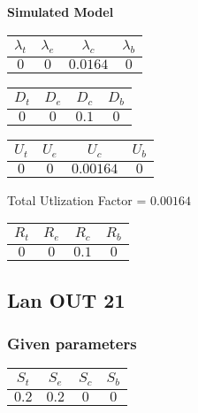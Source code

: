 \documentclass{article}
\begin{document}
\begin{minipage}{0.5\textwidth}
\centering	\textbf{Simulated Model}
\begin{table}[H]
\centering
\begin{tabular}{@{}cccc@{}}
\toprule
$\lambda_t$ & $\lambda_e$ & $\lambda_c$ & $\lambda_b$\\
\midrule
$0$ & $0$ & $0.0164$ & $0$\\
\bottomrule
\end{tabular}
\end{table}
\begin{table}[H]
\centering
\begin{tabular}{@{}cccc@{}}
\toprule
$D_t$ & $D_e$ & $D_c$ & $D_b$\\
\midrule
$0$ & $0$ & $0.1$ & $0$\\
\bottomrule
\end{tabular}
\end{table}\begin{table}[H]
\centering
\begin{tabular}{@{}cccc@{}}
\toprule
$U_t$ & $U_e$ & $U_c$ & $U_b$\\
\midrule
$0$ & $0$ & $0.00164$ & $0$\\
\bottomrule
\end{tabular}
\end{table}
\centering Total Utlization Factor = $0.00164$
\begin{table}[H]
\centering
\begin{tabular}{@{}cccc@{}}
\toprule
$R_t$ & $R_e$ & $R_c$ & $R_b$\\
\midrule
$0$ & $0$ & $0.1$ & $0$\\
\bottomrule
\end{tabular}
\end{table}
\end{minipage}\subsection{Lan OUT 21}
\subsubsection{Given parameters}
\begin{table}[H]
\centering
\begin{tabular}{@{}cccc@{}}
\toprule
$S_t$ & $S_e$ & $S_c$ & $S_b$\\
\midrule
$0.2$ & $0.2$ & $0$ & $0$\\
\bottomrule
\end{tabular}
\end{table}
\end{document}
